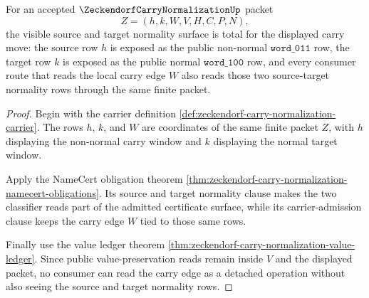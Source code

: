 \begin{theorem}
\label{thm:zeckendorf-carry-normalization-source-target-totality}
For an accepted $\ZeckendorfCarryNormalizationUp$ packet
$$
Z=(h,k,W,V,H,C,P,N),
$$
the visible source and target normality surface is total for the displayed
carry move: the source row $h$ is exposed as the public non-normal
$\mathtt{word\_011}$ row, the target row $k$ is exposed as the public normal
$\mathtt{word\_100}$ row, and every consumer route that reads the local carry
edge $W$ also reads those two source-target normality rows through the same
finite packet.
\end{theorem}
\begin{proof}
Begin with the carrier definition
\autoref{def:zeckendorf-carry-normalization-carrier}. The rows $h$, $k$, and
$W$ are coordinates of the same finite packet $Z$, with $h$ displaying the
non-normal carry window and $k$ displaying the normal target window.

Apply the NameCert obligation theorem
\autoref{thm:zeckendorf-carry-normalization-namecert-obligations}. Its source
and target normality clause makes the two classifier reads part of the admitted
certificate surface, while its carrier-admission clause keeps the carry edge
$W$ tied to those same rows.

Finally use the value ledger theorem
\autoref{thm:zeckendorf-carry-normalization-value-ledger}. Since public
value-preservation reads remain inside $V$ and the displayed packet, no
consumer can read the carry edge as a detached operation without also seeing
the source and target normality rows.
\end{proof}

